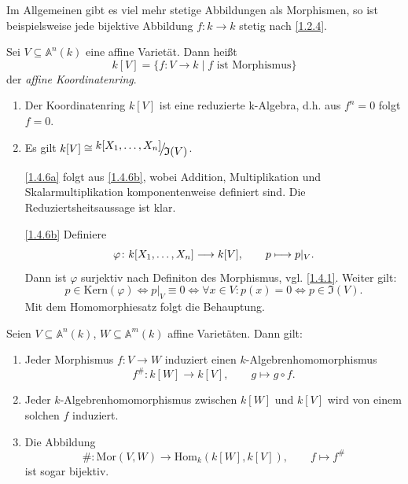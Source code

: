 \documentclass[a4paper,12pt]{scrbook}
\makeatletter
\theoremstyle{blah}
\theoremstyle{stz}
\renewcommand{\proofname}{Beweis}
\renewenvironment{proof}[1][\proofname]{\par
  \pushQED{\qed}%
  \normalfont \topsep6\p@\@plus6\p@\relax
  \trivlist
  \item[\hskip\labelsep
        \itshape
    #1\@addpunct{:}]\ignorespaces
}{%
  \popQED\endtrivlist\@endpefalse
}
\def\A{\mathbb{A}}
\def\I{\mathfrak{I}}
\newcommand{\Hom}{\mathrm{Hom}}
\newcommand{\Mor}{\mathrm{Mor}}
\newcommand{\Kern}{\mathrm{Kern}}
\newcommand{\ra}{\longrightarrow}
\renewcommand{\phi}{\varphi}
\renewcommand{\mapsto}{\longmapsto}
\newcommand{\Quotient}[2]{
  \raisebox{0.7ex}{\ensuremath{#1}}
  \ensuremath{\mkern-3mu}\big/\ensuremath{\mkern-3mu}
  \raisebox{-0.6ex}{\ensuremath{#2}}}
\newcommand{\polyx}[1][n]{\ensuremath%
  [X_{1},\dotsc,X_{#1}]}
\makeatother
\begin{document}
\begin{w}
Im Allgemeinen gibt es viel mehr stetige Abbildungen als Morphismen, so ist beispielsweise jede bijektive Abbildung $f\colon k\ra k$ stetig nach \autoref{1.2.4}.
\end{w}

\begin{dfn}\label{1.4.5}
Sei $V\subseteq \A^n(k)$ eine affine Varietät. Dann heißt 
\[k[V]=\{f\colon V\ra k \mid f\text{ ist Morphismus\}}\]
 der \emph{affine Koordinatenring}.
\end{dfn}

\begin{bem}
\begin{enumerate}
\item\label{1.4.6a} Der Koordinatenring $k[V]$ ist eine reduzierte k-Algebra, d.h. aus $f^n=0$ folgt $f=0$.
\item\label{1.4.6b} Es gilt $k[V] \cong \Quotient{k\polyx}{\I(V)}$.
\end{enumerate}
\end{bem}

\begin{proof}
\begin{enumerate}
\item[\ref{1.4.6a}] folgt aus \ref{1.4.6b}, wobei Addition, Multiplikation und Skalarmultiplikation komponentenweise definiert sind. Die Reduziertsheitsaussage ist klar.
\item[\ref{1.4.6b}] Definiere
\[\phi\colon  k\polyx\ra k[V],  \qquad p\mapsto p|_V.\]
Dann ist $\phi$ surjektiv nach Definiton des Morphismus, vgl. \autoref{1.4.1}. Weiter gilt:
\[p \in \Kern(\phi) \iff p|_V \equiv 0 \iff \forall x\in V: p(x)=0 \iff p\in \I(V).\] 
Mit dem Homomorphiesatz folgt die Behauptung. 
\end{enumerate}
\end{proof}

\begin{bem}\label{1.4.7} Seien $V\subseteq \A^n(k)$, $W\subseteq \A^m(k)$ affine Varietäten. Dann gilt:
\begin{enumerate}
\item Jeder Morphismus $f\colon V\ra W$ induziert einen $k$-Algebrenhomomorphismus
\[f^{\#}\colon  k[W]\ra k[V], \qquad g\mapsto g\circ f.\]
\item Jeder $k$-Algebrenhomomorphismus zwischen $k[W]$ und $k[V]$ wird von einem solchen $f$ induziert.
\item Die Abbildung 
\[\#\colon \Mor(V,W)\ra \Hom_k(k[W],k[V]), \qquad f\mapsto f^{\#}\]
ist sogar bijektiv.
\end{enumerate}
\end{bem}
\end{document}
